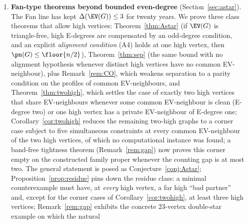 \begin{enumerate}[label=(\roman*),leftmargin=2em]
Chen and Wu \cite{CW25} proved Gallai's conjecture for all block graphs. For the subfamily of
\emph{odd clique chains} (block graphs whose block tree is a path and whose blocks are odd
complete graphs) we prove the precise refinements
\[
\pn(G)\le \floor{n/2}\ \ (b\ge 2), \qquad \pn(G)\le \floor{n/2}-1\ \ (b\ge 4),
\]
where $b$ is the number of blocks, along with the exact value $\pn(G)=\ceil{n/2}$ for a single
block. The local engine, of independent interest, is: \emph{for every odd $j$ and every
Hamilton path $P$ of $K_{2j+1}$, the graph $K_{2j+1}-P$ decomposes into $j$ paths.} The base
zigzag objects are classical \cite{LP92,Alspach08}; the statement for an \emph{arbitrarily
prescribed} Hamilton path appears to be new (the Oberwolfach problem and its variants concern
$2$-regular factors and do not cover path factors), and we could not find it in the Hamilton
decomposition literature.
\item \textbf{Fan-type theorems beyond bounded even-degree} (Section~\ref{sec:astar}). The Fan
line \cite{Fan05,BS21,FHZ23} has kept $\Delta(\EV(G))\le 3$ for twenty years. We prove three
class theorems that allow high vertices: Theorem~\ref{thm:Astar} (if $\EV(G)$ is triangle-free,
high E-degrees are compensated by an odd-degree condition, and an explicit \emph{alignment
condition} (A4) holds at one high vertex, then $\pn(G)\le\floor{n/2}$), Theorem~\ref{thm:sep}
(the same bound with no alignment hypothesis whenever distinct high vertices have no common
EV-neighbour), plus Remark~\ref{rem:CO}, which weakens separation to a parity condition on the
profiles of common EV-neighbours, and Theorem~\ref{thm:twohigh}, which settles the case of
exactly two high vertices that share EV-neighbours whenever some common EV-neighbour is clean
(E-degree two) or one high vertex has a private EV-neighbour of E-degree one;
Corollary~\ref{cor:twohigh} reduces the remaining two-high graphs to a corner case subject to
five simultaneous constraints at every common EV-neighbour of the two high vertices, of which
no computational instance was found; a band-free tightness theorem (Remark~\ref{rem:gap}) now
proves this corner empty on the constructed family proper whenever the counting gap is at most
two. The general statement is posed as
Conjecture~\ref{conj:Astar}; Proposition~\ref{prop:residue} pins down the residue class: a
minimal counterexample must have, at \emph{every} high vertex, a far high ``bad partner'' and,
except for the corner cases of Corollary~\ref{cor:twohigh}, at least three high vertices;
Remark~\ref{rem:gap} exhibits the concrete $23$-vertex double-star example on which the natural

\end{enumerate}

